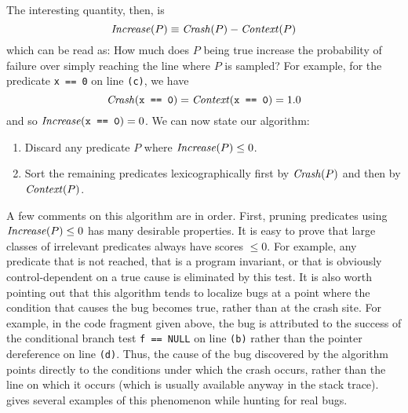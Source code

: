 The interesting quantity, then, is
\begin{equation*}
 \mbox{\textit{Increase}}(P) \equiv \mbox{\textit{Crash}}(P) - \mbox{\textit{Context}}(P) \label{eqn:1}
\end{equation*}
which can be read as: How much does $P$ being true increase the probability of failure
over simply reaching the line where $P$ is sampled?  For example, for the predicate {\tt x == 0} on line {\tt (c)},
we have
\[\mbox{\textit{Crash}}(\mbox{\tt x == 0}) = \mbox{\textit{Context}}(\mbox{\tt x == 0}) = 1.0 \]
and so $\mbox{\textit{Increase}}(\mbox{\tt x == 0}) = 0$.
We can now state our algorithm:
\begin{enumerate}
\item Discard any predicate $P$ where $\mbox{\textit{Increase}}(P) \leq 0$.

\item Sort the remaining predicates lexicographically first by $\mbox{\textit{Crash}}(P)$ and then by $\mbox{\textit{Context}}(P)$.
\end{enumerate}

A few comments on this algorithm are in order.  First, pruning
predicates using $\mbox{\textit{Increase}}(P) \leq 0$ has many desirable
properties.  It is easy to prove that large classes of irrelevant
predicates always have scores $\leq 0$.  For example, any predicate
that is not reached, that is a program invariant, or that is obviously
control-dependent on a true cause is eliminated by this test.  It is
also worth pointing out that this algorithm tends to localize bugs at
a point where the condition that causes the bug becomes true, rather than at
the crash site.  For example, in the code fragment given above, the bug is
attributed to the success of the conditional branch test {\tt f ==
NULL} on line {\tt (b)} rather than the pointer dereference on line
{\tt (d)}.  Thus, the cause of the bug discovered by the algorithm
points directly to the conditions under which the crash occurs, rather than
the line on which it occurs (which is usually available anyway in the
stack trace).  gives several examples
of this phenomenon while hunting for real bugs.


